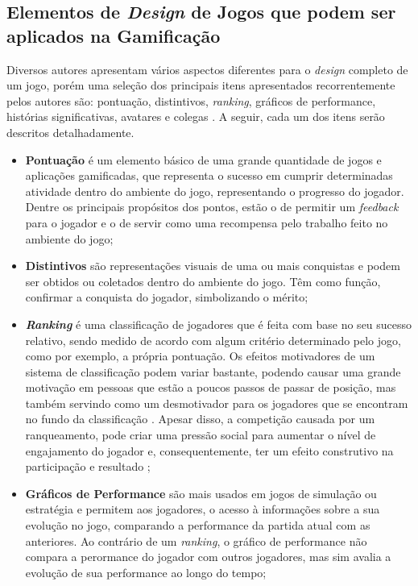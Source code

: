 \subsection{Elementos de \textit{Design} de Jogos que podem ser aplicados na Gamificação}
\label{gamification_elements}

Diversos autores apresentam vários aspectos diferentes para o \textit{design} completo de um jogo, porém uma seleção dos principais itens apresentados recorrentemente pelos autores são: pontuação, distintivos, \textit{ranking}, gráficos de performance, histórias significativas, avatares e colegas \cite{gamification_motivates}. A seguir, cada um dos itens serão descritos detalhadamente.

\begin{itemize}
    \item \textbf{Pontuação} é um elemento básico de uma grande quantidade de jogos e aplicações gamificadas, que representa o sucesso em cumprir  determinadas atividade dentro do ambiente do jogo, representando o progresso do jogador. Dentre os principais propósitos dos pontos, estão o de permitir um \textit{feedback} para o jogador e o de servir como uma recompensa pelo trabalho feito no ambiente do jogo;
    \item \textbf{Distintivos} são representações visuais de uma ou mais conquistas e podem ser obtidos ou coletados dentro do ambiente do jogo. Têm como função, confirmar a conquista do jogador, simbolizando o mérito;
    \item \textbf{\textit{Ranking}} é uma classificação de jogadores que é feita com base no seu sucesso relativo, sendo medido de acordo com algum critério determinado pelo jogo, como por exemplo, a própria pontuação. Os efeitos motivadores de um sistema de classificação podem variar bastante, podendo causar uma grande motivação em pessoas que estão a poucos passos de passar de posição, mas também servindo como um desmotivador para os jogadores que se encontram no fundo da classificação \cite{ranking_motivation}. Apesar disso, a competição causada por um ranqueamento, pode criar uma pressão social para aumentar o nível de engajamento do jogador e, consequentemente, ter um efeito construtivo na participação e resultado \cite{ranking_competition};
    \item \textbf{Gráficos de Performance} são mais usados em jogos de simulação ou estratégia e permitem aos jogadores, o acesso à informações sobre a sua evolução no jogo, comparando a performance da partida atual com as anteriores. Ao contrário de um \textit{ranking}, o gráfico de performance não compara a perormance do jogador com outros jogadores, mas sim avalia a evolução de sua performance ao longo do tempo;

\end{itemize}
